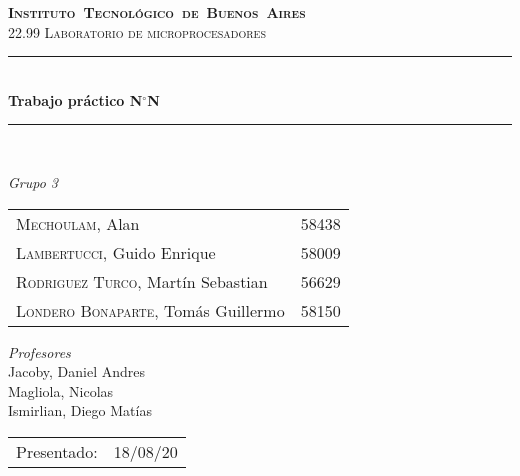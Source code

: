 \begin{titlepage}
\newcommand{\HRule}{\rule{\linewidth}{0.5mm}}
\center
\mbox{\textsc{\LARGE \bfseries {Instituto Tecnológico de Buenos Aires}}}\\[1.5cm]
\textsc{\Large 22.99 Laboratorio de microprocesadores}\\[0.5cm]


\HRule \\[0.6cm]
{ \Huge \bfseries Trabajo práctico N$^{\circ}$N}\\[0.4cm] 
\HRule \\[1.5cm]


{\large

\emph{Grupo 3}\\
\vspace{3px}

\begin{tabular}{lr} 	
\textsc{Mechoulam}, Alan  &  58438\\
\textsc{Lambertucci}, Guido Enrique  & 58009 \\
\textsc{Rodriguez Turco}, Martín Sebastian  & 56629 \\
\textsc{Londero Bonaparte}, Tomás Guillermo  & 58150 \\
\end{tabular}

\vspace{20px}

\emph{Profesores}\\
Jacoby, Daniel Andres\\
Magliola, Nicolas\\
Ismirlian, Diego Matías\\

\vspace{3px}

\vspace{100px}

\begin{tabular}{ll}

Presentado: & 18/08/20\\

\end{tabular}

}

\vfill

\end{titlepage}
